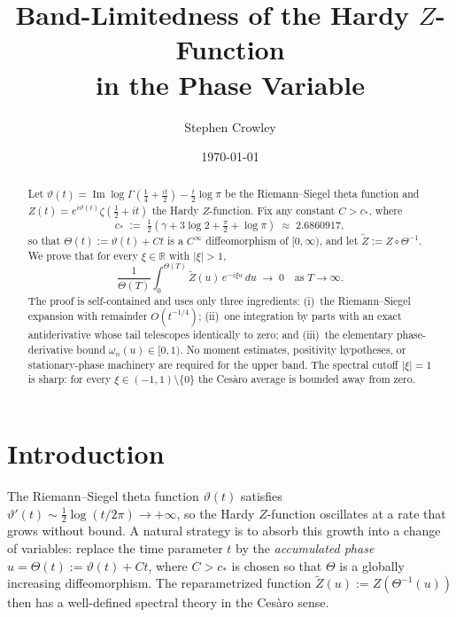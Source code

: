 \documentclass[12pt]{amsart}
\title[Band-Limitedness of the Hardy $Z$-Function]{%
  Band-Limitedness of the Hardy $Z$-Function\\
  in the Phase Variable}
\author{Stephen Crowley}
\date{\today}
\theoremstyle{definition}
\theoremstyle{remark}
\DeclareMathOperator{\Ima}{Im}
\begin{document}

\begin{abstract}
Let $\vartheta(t)=\Ima\log\Gamma\!\left(\tfrac{1}{4}+\tfrac{it}{2}\right)
-\tfrac{t}{2}\log\pi$ be the Riemann--Siegel theta function and
$Z(t)=e^{i\vartheta(t)}\zeta\!\left(\tfrac{1}{2}+it\right)$ the Hardy
$Z$-function.  Fix any constant $C>c_*$, where
\[
  c_* \;:=\; \tfrac{1}{2}\!\left(\gamma+3\log 2+\tfrac{\pi}{2}+\log\pi\right)
  \;\approx\; 2.6860917,
\]
so that $\Theta(t):=\vartheta(t)+Ct$ is a $C^{\infty}$ diffeomorphism
of $[0,\infty)$, and let $\widetilde{Z}:=Z\circ\Theta^{-1}$.  We prove that
for every $\xi\in\mathbb{R}$ with $|\xi|>1$,
\[
  \frac{1}{\Theta(T)}\int_{0}^{\Theta(T)}\widetilde{Z}(u)\,
  e^{-i\xi u}\,du\;\longrightarrow\;0
  \quad\text{as }T\to\infty.
\]
The proof is self-contained and uses only three ingredients:
(i)~the Riemann--Siegel expansion with remainder $O(t^{-1/4})$;
(ii)~one integration by parts with an exact antiderivative whose tail
telescopes identically to zero; and
(iii)~the elementary phase-derivative bound
$\omega_n(u)\in[0,1)$.
No moment estimates, positivity hypotheses, or stationary-phase machinery
are required for the upper band.
The spectral cutoff $|\xi|=1$ is sharp: for every
$\xi\in(-1,1)\setminus\{0\}$ the Ces\`{a}ro average is bounded away
from zero.
\end{abstract}

\maketitle
\tableofcontents

\section{Introduction}

The Riemann--Siegel theta function $\vartheta(t)$ satisfies
$\vartheta'(t)\sim\tfrac{1}{2}\log(t/2\pi)\to+\infty$, so the Hardy
$Z$-function oscillates at a rate that grows without bound.  A natural
strategy is to absorb this growth into a change of variables: replace the
time parameter $t$ by the \emph{accumulated phase}
$u=\Theta(t):=\vartheta(t)+Ct$, where $C>c_*$ is chosen so that
$\Theta$ is a globally increasing diffeomorphism.  The reparametrized
function $\widetilde{Z}(u):=Z(\Theta^{-1}(u))$ then has a well-defined
spectral theory in the Ces\`{a}ro sense.
\end{document}

